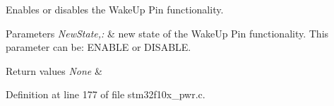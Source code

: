 Enables or disables the Wake\-Up Pin functionality. 


\begin{DoxyParams}{Parameters}
{\em New\-State,\-:} & new state of the Wake\-Up Pin functionality. This parameter can be\-: E\-N\-A\-B\-L\-E or D\-I\-S\-A\-B\-L\-E. \\
\hline
\end{DoxyParams}

\begin{DoxyRetVals}{Return values}
{\em None} & \\
\hline
\end{DoxyRetVals}


Definition at line 177 of file stm32f10x\-\_\-pwr.\-c.

